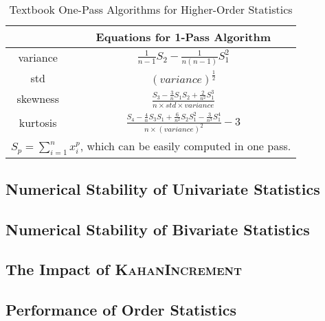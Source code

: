 
\begin{table}[tbh]
\caption{Textbook One-Pass Algorithms for Higher-Order Statistics}
\label{tab:1-pass}
\centering
\begin{tabular}{|c|c|}
\hline
& Equations for 1-Pass Algorithm \\
\hline
variance & $\frac{1}{n-1}S_2-\frac{1}{n(n-1)}S_1^2$ \\
\hline
std & $(variance)^{\frac{1}{2}}$ \\
\hline
skewness & $\frac{S_3 - \frac{3}{n}S_1S_2 + \frac{2}{n^2}S_1^3}{n\times std\times variance}$\\
\hline
kurtosis & $\frac{S_4 - \frac{4}{n}S_3S_1 + \frac{6}{n^2}S_2S_1^2 - \frac{3}{n^3}S_1^4}{n\times (variance)^2} - 3$ \\
\hline
\multicolumn{2}{c}{$S_p=\sum\limits_{i=1}^{n}x_i^p$, which can be easily computed in one pass.}
\end{tabular}
\end{table}

\subsection{Numerical Stability of Univariate Statistics}\label{sec:univariate_exp}


\subsection{Numerical Stability of Bivariate Statistics}\label{sec:bivariate_exp}


\subsection{The Impact of \textsc{KahanIncrement}}
\label{sec:comparison_exp}


\subsection{Performance of Order Statistics}




